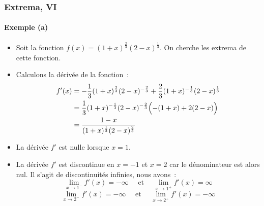 \documentclass[10pt,notheorems]{beamer}
\theoremstyle{plain}
\theoremstyle{definition} %
\begin{document}
\begin{frame}
  \frametitle{Extrema, VI}
  \framesubtitle{Exemple (a)}

  \medskip

  \begin{itemize}

  \item Soit la fonction $f(x) = (1+x)^{\frac{2}{3}}(2-x)^{\frac{1}{3}}$. On cherche les extrema de cette fonction.\newline

  \item Calculons la dérivée de la fonction~:
    \[
      \begin{split}
        f'(x) &= -\frac{1}{3}(1+x)^{\frac{2}{3}}(2-x)^{-\frac{2}{3}}+\frac{2}{3}(1+x)^{-\frac{1}{3}}(2-x)^{\frac{1}{3}}\\
        &= \frac{1}{3}(1+x)^{-\frac{1}{3}}(2-x)^{-\frac{2}{3}}\Bigl(-(1+x)+2(2-x)\Bigr)\\
        &=\frac{1-x}{(1+x)^{\frac{1}{3}}(2-x)^{\frac{2}{3}}}
      \end{split}
    \]

    \bigskip

  \item La dérivée $f'$ est nulle lorsque $x=1$.\newline

  \item La dérivée $f'$ est discontinue en $x=-1$ et $x=2$ car le dénominateur est alors nul. Il s'agit de discontinuités infinies, nous avons~:
    \[
      \lim_{x\rightarrow 1^-}f'(x) = -\infty \quad \text{ et } \quad \lim_{x\rightarrow 1^+}f'(x) = \infty
    \]
    \[
      \lim_{x\rightarrow 2^-}f'(x) = -\infty \quad \text{ et } \quad \lim_{x\rightarrow 2^+}f'(x) = -\infty
    \]

  \end{itemize}

\end{frame}
\end{document}
